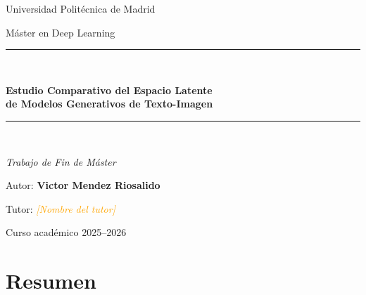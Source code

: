 \documentclass[12pt, a4paper, twoside]{book}
\newcommand{\PLACEHOLDER}[1]{\textcolor{orange}{\textit{[#1]}}}
\begin{document}

\begin{titlepage}
  \centering
  \vspace*{2cm}
  {\Large Universidad Politécnica de Madrid\par}
  \vspace{0.5cm}
  {\large Máster en Deep Learning\par}
  \vspace{3cm}
  \rule{\linewidth}{0.5pt}\\[0.4cm]
  {\LARGE\bfseries Estudio Comparativo del Espacio Latente\\[0.3cm]
   de Modelos Generativos de Texto-Imagen\par}
  \rule{\linewidth}{0.5pt}\\[1.5cm]
  {\large\itshape Trabajo de Fin de Máster\par}
  \vspace{2cm}
  {\large Autor: \textbf{Victor Mendez Riosalido}\par}
  \vspace{0.5cm}
  {\large Tutor: \PLACEHOLDER{Nombre del tutor}\par}
  \vfill
  {\large Curso académico 2025--2026\par}
\end{titlepage}

\frontmatter

\chapter*{Resumen}
\end{document}
